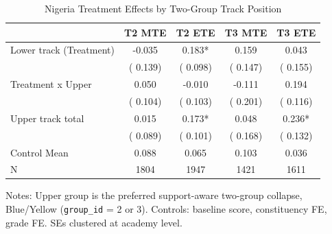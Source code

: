 \begin{table}[!htbp]
\centering
\caption{Nigeria Treatment Effects by Two-Group Track Position}
\label{tab:ng_upper_lower}
\begin{threeparttable}
\begin{tabular}[t]{lcccc}
\toprule
 & T2 MTE & T2 ETE & T3 MTE & T3 ETE \\
\midrule
Lower track (Treatment) &  -0.035 &   0.183* &   0.159 &   0.043 \\
 & (  0.139) & (  0.098) & (  0.147) & (  0.155) \\
Treatment x Upper &   0.050 &  -0.010 &  -0.111 &   0.194 \\
 & (  0.104) & (  0.103) & (  0.201) & (  0.116) \\
Upper track total &   0.015 &   0.173* &   0.048 &   0.236* \\
 & (  0.089) & (  0.101) & (  0.168) & (  0.132) \\
\addlinespace
Control Mean &   0.088 &   0.065 &   0.103 &   0.036 \\
N & 1804 & 1947 & 1421 & 1611 \\
\bottomrule
\end{tabular}
\begin{tablenotes}[para]
\item Notes: Upper group is the preferred support-aware two-group collapse, Blue/Yellow (\texttt{group\_id} = 2 or 3). Controls: baseline score, constituency FE, grade FE. SEs clustered at academy level.
\end{tablenotes}
\end{threeparttable}
\end{table}
